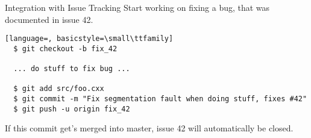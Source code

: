 \begin{frame}[c, fragile]{Integration with Issue Tracking}
  Start working on fixing a bug, that was documented in issue 42.

  \begin{lstlisting}[language=, basicstyle=\small\ttfamily]
  $ git checkout -b fix_42

  ... do stuff to fix bug ...

  $ git add src/foo.cxx
  $ git commit -m "Fix segmentation fault when doing stuff, fixes #42" 
  $ git push -u origin fix_42
  \end{lstlisting}

  If this commit get's merged into master, issue 42 will automatically be closed.
  
\end{frame}
